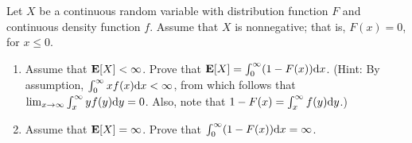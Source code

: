 \documentclass[11pt,a4paper]{article}
\begin{document}
\begin{exercise}
  Let $X$ be a continuous random variable with distribution function $F$
  and continuous density function $f$.
  Assume that $X$ is nonnegative; that is, $F(x) = 0$, for $x \le 0$.
  \begin{enumerate}
    \item[(1)] Assume that $\mathbf{E}[X] < \infty$.
      Prove that $\E[X] = \int_{0}^{\infty} (1 - F(x)) \dx$.
      (Hint: By assumption, $\int_{0}^{\infty} x f(x) \dx < \infty$,
      from which follows that $\lim_{x \to \infty} \int_{x}^{\infty} y f(y) \dy = 0$.
      Also, note that $1 - F(x) = \int_{x}^{\infty} f(y) \dy$.)
    \item[(2)] Assume that $\mathbf{E}[X] = \infty$.
      Prove that $\int_{0}^{\infty} (1 - F(x)) \dx = \infty$.
  \end{enumerate}
\end{exercise}
\end{document}

